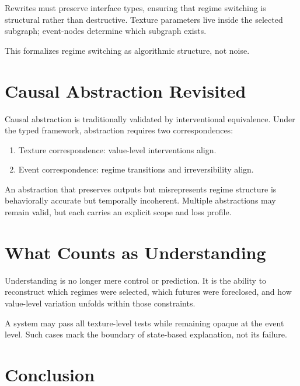 \documentclass[11pt]{article}
\begin{document}
Rewrites must preserve interface types, ensuring that regime switching is
structural rather than destructive. Texture parameters live inside the selected
subgraph; event-nodes determine which subgraph exists.

This formalizes regime switching as algorithmic structure, not noise.

\section{Causal Abstraction Revisited}

Causal abstraction is traditionally validated by interventional equivalence.
Under the typed framework, abstraction requires two correspondences:

\begin{enumerate}
\item Texture correspondence: value-level interventions align.
\item Event correspondence: regime transitions and irreversibility align.
\end{enumerate}

An abstraction that preserves outputs but misrepresents regime structure is
behaviorally accurate but temporally incoherent. Multiple abstractions may remain
valid, but each carries an explicit scope and loss profile.

\section{What Counts as Understanding}

Understanding is no longer mere control or prediction. It is the ability to
reconstruct which regimes were selected, which futures were foreclosed, and how
value-level variation unfolds within those constraints.

A system may pass all texture-level tests while remaining opaque at the event
level. Such cases mark the boundary of state-based explanation, not its failure.

\section{Conclusion}
\end{document}
